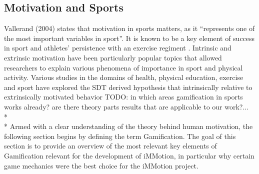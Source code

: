 \subsection{Motivation and Sports}
Vallerand (2004) states that motivation in sports matters, as it ``represents one of the most important variables in sport''. It is known to be a key element of success in sport and athletes' persistence with an exercise regiment \cite{vallerand2007intrinsic}. Intrinsic and extrinsic motivation have been particularly popular topics that allowed researchers to explain various phenomena of importance in sport and physical activity. Various studies in the domains of health, physical education, exercise and sport have explored the SDT derived hypothesis that intrinsically relative to extrinsically motivated behavior  
TODO: in which areas gamification in sports works already? are there theory parts results that are applicable to our work?...\\*\\*
Armed with a clear understanding of the theory behind human motivation, the following section begins by defining the term Gamification. The goal of this section is to provide an overview of the most relevant key elements of Gamification relevant for the development of iMMotion, in particular why certain game mechanics were the best choice for the iMMotion project.
